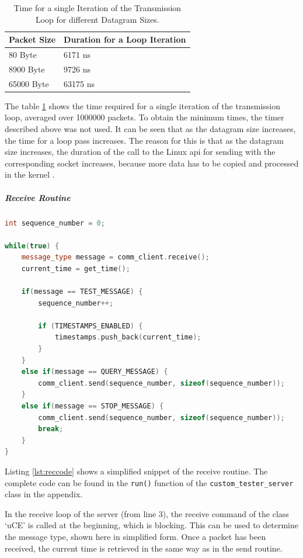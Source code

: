 \begin{table}[h]
\centering
\begin{tabular}{l|l}
	\toprule
	\textbf{Packet Size} & \textbf{Duration for a Loop Iteration} \\
	\midrule
	80 Byte & 6171 ns\\
	8900 Byte & 9726 ns\\
	65000 Byte & 63175 ns\\
	\bottomrule
\end{tabular}
\caption{Time for a single Iteration of the Transmission Loop for different Datagram Sizes.}
\label{tab:senditertime}
\end{table}

The table \ref{tab:senditertime} shows the time required for a single iteration of the transmission loop, averaged over 1000000 packets. To obtain the minimum times, the timer described above was not used. It can be seen that as the datagram size increases, the time for a loop pass increases. The reason for this is that as the datagram size increases, the duration of the call to the Linux \ac{api} for sending with the corresponding socket increases, because more data has to be copied and processed in the kernel \cite{tsgen03}.

\subparagraph{Receive Routine}

\begin{lstlisting}[language=C++, caption=Simplified Code of the Receive Routine., label=lst:reccode]
int sequence_number = 0;

while(true) {
    message_type message = comm_client.receive();
    current_time = get_time();

    if(message == TEST_MESSAGE) {
        sequence_number++;

        if (TIMESTAMPS_ENABLED) {
            timestamps.push_back(current_time);
        }
    }
    else if(message == QUERY_MESSAGE) {
        comm_client.send(sequence_number, sizeof(sequence_number));
    }
    else if(message == STOP_MESSAGE) {
        comm_client.send(sequence_number, sizeof(sequence_number));
        break;
    }
}
\end{lstlisting}

Listing \ref{lst:reccode} shows a simplified snippet of the receive routine. The complete code can be found in the \texttt{run()} function of the \texttt{custom\_tester\_server} class in the appendix.

In the receive loop of the server (from line 3), the receive command of the class `uCE' is called at the beginning, which is blocking. This can be used to determine the message type, shown here in simplified form. Once a packet has been received, the current time is retrieved in the same way as in the send routine.

